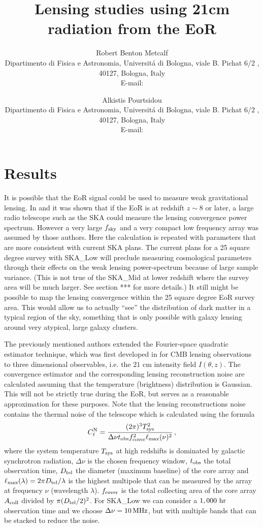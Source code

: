 \documentclass{PoS}
\title{Lensing studies using 21cm radiation from the EoR}
\author{Robert Benton Metcalf\\
        Dipartimento di Fisica e Astronomia, Universit\'{a} di Bologna, viale B. Pichat 6/2 , 40127, Bologna, Italy\\
        E-mail: \email{robertbenton.metcalf@unibo.it}}
\author{Alkistis Pourtsidou\\
        Dipartimento di Fisica e Astronomia, Universit\'{a} di Bologna, viale B. Pichat 6/2 , 40127, Bologna, Italy\\
        E-mail: \email{alkistis.pourtsidou@unibo.it}}
\begin{document}
\section{Results}

It is possible that the EoR signal could be used to measure weak gravitational lensing.
In \cite{Zahn:2005ap} and \cite{Metcalf:2009}  it was shown that if the EoR is at redshift 
$z \sim 8$ or later, a large radio telescope such as the SKA could measure the lensing convergence power spectrum.  However a very large $f_{\rm sky}$ and a very compact low frequency array was assumed by those authors.  Here the calculation is repeated with parameters that are more consistent with current SKA plans.  The current plans for a 25 square degree survey with SKA\_Low will preclude measuring cosmological parameters through their effects on the weak lensing power-spectrum because of large sample variance.  (This is not true of the SKA\_Mid at lower redshift where the survey area will be much larger. See section *** for more details.)  It still might be possible to map the lensing convergence within the 25 square degree EoR survey area.  This would allow us to actually ``see'' the distribution of dark matter in a typical region of the sky, something that is only possible with galaxy lensing around very atypical, large galaxy clusters.

The previously mentioned authors extended the
Fourier-space quadratic estimator technique, which was first developed in 
\cite{Hu:2001tn} for CMB lensing  observations to three dimensional
observables, i.e. the $21$ cm intensity field $I(\theta,z)$.  
The  convergence
estimator and the corresponding lensing reconstruction noise are
calculated assuming that the temperature (brightness) distribution is
Gaussian. This will not be strictly true during the EoR, but serves as a reasonable approximation for these purposes. Note that the lensing reconstructions noise contains the thermal noise of the telescope which is calculated using the formula
\begin{equation}
C^{\rm N}_\ell = \frac{(2\pi)^3 T^2_{\rm sys}}{\Delta \nu t_{\rm obs} f^2_{\rm cover} \ell_{\rm max}(\nu)^2} \, ,
\end{equation} where the system temperature $T_{\rm sys}$ at high redshifts
 is dominated by galactic synchrotron radiation, $\Delta \nu$ is the chosen frequency window, $t_{\rm obs}$ the total observation time, $D_{\rm tel}$ the diameter (maximum baseline) of the core array and $\ell_{\rm max}(\lambda)=2\pi D_{\rm tel}/\lambda$ is the highest multipole that can be measured by the array at frequency $\nu$ (wavelength $\lambda$). $f_{\rm cover}$ is the total collecting area of the core array $A_{\rm coll}$ divided by $\pi(D_{\rm tel}/2)^2$. For SKA\_Low we can consider a $1,000~{\rm hr}$ observation time and we choose $\Delta \nu = 10 \, {\rm MHz}$, but with multiple bands that can be stacked to reduce the noise. 
 
\end{document}
